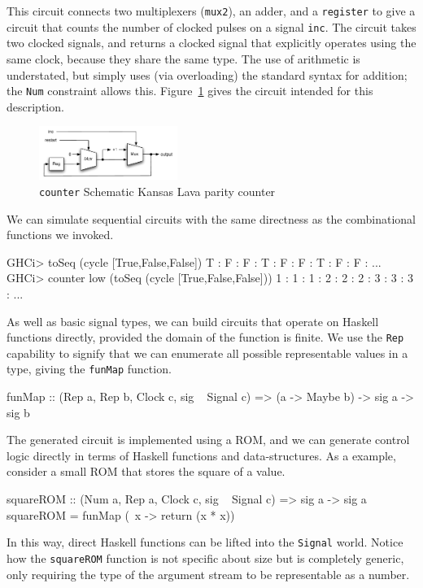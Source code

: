 \documentclass[11pt]{article}
\begin{document}
This circuit connects two multiplexers (\verb|mux2|),
an adder,
and a \verb|register|
to give a circuit that counts the number of
clocked pulses on a signal \verb|inc|.
The circuit takes two clocked signals,
and returns a clocked signal that explicitly
operates using the same clock, because they
share the same type.
The use of arithmetic is understated,
but simply uses (via overloading) the
standard syntax for addition; the {\tt Num}
constraint allows this.
Figure~\ref{fig:counter-picture} gives the
circuit intended for this description.

\begin{figure}[!t]
    \includegraphics[width=0.4\textwidth]{images/Counter.pdf}
  \caption{{\tt counter} Schematic Kansas Lava parity counter}
  \label{fig:counter-picture}
\end{figure}


We can simulate sequential circuits with the
same directness as the combinational functions we invoked.
\begin{Code}
GHCi> toSeq (cycle [True,False,False])
T : F : F : T : F : F : T : F : F : ...
GHCi> counter low (toSeq (cycle [True,False,False]))
1 : 1 : 1 : 2 : 2 : 2 : 3 : 3 : 3 : ...
\end{Code}

As well as basic signal types,
we can build circuits that operate on Haskell
functions directly, provided the domain of the
function is finite. We use the \verb|Rep|
capability to signify that we can enumerate
all possible representable values in a type,
giving the \verb|funMap| function.
\begin{Code}
funMap :: (Rep a, Rep b, Clock c, sig ~ Signal c) => (a -> Maybe b) -> sig a -> sig b
\end{Code}
The generated circuit is implemented using a ROM,
and we can generate control logic
directly in terms of Haskell functions
and data-structures. As a example, consider
a small ROM that stores the square of a
value.
\begin{Code}
squareROM :: (Num a, Rep a, Clock c, sig ~ Signal c) => sig a -> sig a
squareROM = funMap (\ x -> return (x * x))
\end{Code}
In this way, direct Haskell functions
can be lifted into the \verb|Signal| world.
Notice how the \verb|squareROM| function is
not specific about size but is
completely generic, only requiring the
type of the argument stream
to be representable as a number.
\end{document}
